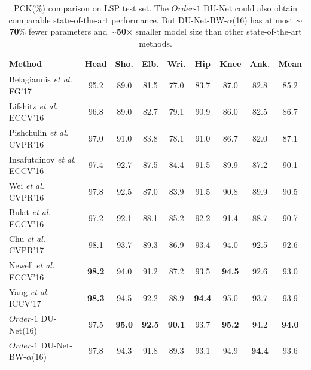 \begin{table}[htb]
\begin{center}
\small
\caption{PCK(\%) comparison on LSP test set. The $Order$-$1$ DU-Net could also obtain comparable state-of-the-art performance. But DU-Net-BW-$\alpha$(16) has at most $\sim${\bf 70}\% fewer parameters and $\sim${\bf 50}$\times$ smaller model size than other state-of-the-art methods.}\label{tb:lsp}
\setlength\tabcolsep{1.5pt}
\begin{tabular}{@{}lcccccccc@{}}
\toprule
Method & Head & Sho. & Elb. & Wri. & Hip & Knee & Ank. & Mean\\
\hline
Belagiannis \textit{et al.} FG'17 \cite{belagiannis2017recurrent} & 95.2 & 89.0 & 81.5 & 77.0 & 83.7 & 87.0 & 82.8 & 85.2\\
Lifshitz \textit{et al.} ECCV'16 \cite{lifshitz2016human} & 96.8 & 89.0 & 82.7 & 79.1 & 90.9 & 86.0 & 82.5 & 86.7\\
Pishchulin \textit{et al.} CVPR'16 \cite{pishchulin2016deepcut} &  97.0 & 91.0 & 83.8 & 78.1 & 91.0 & 86.7 & 82.0 & 87.1\\
Insafutdinov \textit{et al.} ECCV'16 \cite{insafutdinov2016deepercut}& 97.4 & 92.7 & 87.5 & 84.4 & 91.5 & 89.9 & 87.2 & 90.1\\
Wei \textit{et al.} CVPR'16 \cite{wei2016convolutional}& 97.8 & 92.5 & 87.0 & 83.9 & 91.5 & 90.8 & 89.9 & 90.5\\
Bulat \textit{et al.} ECCV'16 \cite{bulat2016human}& 97.2 & 92.1 & 88.1 & 85.2 & 92.2 & 91.4 & 88.7 & 90.7\\
Chu \textit{et al.} CVPR'17 \cite{chu2017multi}& 98.1 & 93.7 & 89.3 & 86.9 &  93.4 & 94.0 & 92.5 & 92.6\\
Newell {\it et al.} ECCV'16 \cite{newell2016stacked} & {\bf 98.2} & 94.0 & 91.2 & 87.2 & 93.5 & {\bf 94.5} & 92.6 & 93.0\\
Yang \textit{et al.} ICCV'17 \cite{yang2017learning} & {\bf 98.3} & 94.5 & 92.2 & 88.9 & {\bf 94.4} & 95.0 & 93.7 & 93.9\\
\hline
$Order$-$1$ DU-Net(16) &  97.5 & {\bf 95.0} & {\bf 92.5} & {\bf 90.1} &  93.7 &  {\bf 95.2} & 94.2 & {\bf 94.0}\\
$Order$-$1$ DU-Net-BW-$\alpha$(16) &  97.8 & 94.3 & 91.8 & 89.3 &  93.1 &  94.9 & {\bf 94.4} & 93.6\\

\bottomrule
\end{tabular}
\end{center}
\end{table}



